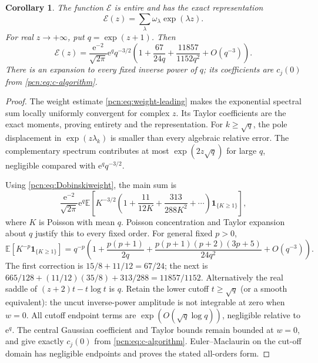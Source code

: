 \documentclass[11pt,letterpaper]{article}
\newtheorem{corollary}[theorem]{Corollary}
\theoremstyle{remark}\newtheorem{remark}[theorem]{Remark}
\newcommand{\E}{\mathbb E}
\newcommand{\ee}{\mathrm e}
\begin{document}
\begin{corollary}\label{pcn:cor:EGF}
The function $\mathcal E$ is entire and has the exact representation
\[
 \mathcal E(z)=\sum_\lambda\omega_\lambda\exp(\lambda z).
\]
For real $z\to+\infty$, put $q=\exp(z+1)$. Then
\begin{equation}\label{pcn:eq:EGF}
 \mathcal E(z)=\frac{\ee^{-2}}{\sqrt{2\pi}}\ee^q q^{-3/2}
 \left(1+\frac{67}{24q}+\frac{11857}{1152q^2}+O(q^{-3})\right).
\end{equation}
There is an expansion to every fixed inverse power of $q$; its coefficients are $c_j(0)$ from \eqref{pcn:eq:c-algorithm}.
\end{corollary}
\begin{proof}
The weight estimate \eqref{pcn:eq:weight-leading} makes the exponential spectral sum locally uniformly convergent for complex $z$. Its Taylor coefficients are the exact moments, proving entirety and the representation. For $k\ge\sqrt q$, the pole displacement in $\exp(z\lambda_k)$ is smaller than every algebraic relative error. The complementary spectrum contributes at most $\exp(2z\sqrt q)$ for large $q$, negligible compared with $\ee^q q^{-3/2}$.

Using \eqref{pcn:eq:Dobinskiweight}, the main sum is
\[
 \frac{\ee^{-2}}{\sqrt{2\pi}}\ee^q
 \E\left[K^{-3/2}\left(1+\frac{11}{12K}
                          +\frac{313}{288K^2}+\cdots\right)
                    \mathbf1_{\{K\ge1\}}\right],
\]
where $K$ is Poisson with mean $q$. Poisson concentration and Taylor expansion about $q$ justify this to every fixed order. For general fixed $p>0$,
\[
 \E[K^{-p}\mathbf1_{\{K\ge1\}}]
 =q^{-p}\left(1+\frac{p(p+1)}{2q}
 +\frac{p(p+1)(p+2)(3p+5)}{24q^2}+O(q^{-3})\right).
\]
The first correction is $15/8+11/12=67/24$; the next is
$665/128+(11/12)(35/8)+313/288=11857/1152$.
Alternatively the real saddle of $(z+2)t-t\log t$ is $q$. Retain the lower cutoff $t\ge\sqrt q$ (or a smooth equivalent): the uncut inverse-power amplitude is not integrable at zero when $w=0$. All cutoff endpoint terms are $\exp(O(\sqrt q\log q))$, negligible relative to $\ee^q$. The central Gaussian coefficient and Taylor bounds remain bounded at $w=0$, and give exactly $c_j(0)$ from \eqref{pcn:eq:c-algorithm}. Euler--Maclaurin on the cut-off domain has negligible endpoints and proves the stated all-orders form.
\end{proof}
\end{document}
